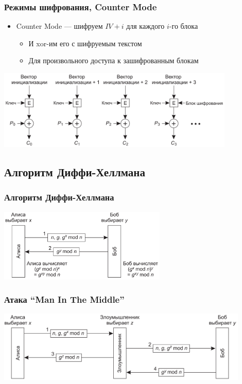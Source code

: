 \documentclass{../cscslides}
\begin{document}
    \begin{frame}
        \frametitle{Режимы шифрования, Counter Mode}
        \begin{itemize}
            \item Counter Mode --- шифруем $IV + i$ для каждого $i$-го блока
            \begin{itemize}
                \item И xor-им его с шифруемым текстом
                \item Для произвольного доступа к зашифрованным блокам
            \end{itemize}
        \end{itemize}
        \begin{center}
            \includegraphics[width=0.85\textwidth]{cm.png}
        \end{center}
    \end{frame}

    \subsection{Алгоритм Диффи-Хеллмана}

    \begin{frame}
        \frametitle{Алгоритм Диффи-Хеллмана}
        \begin{center}
            \includegraphics[width=0.6\textwidth]{diffieHellman.png}
        \end{center}
    \end{frame}

    \begin{frame}
        \frametitle{Атака ``Man In The Middle''}
        \begin{center}
            \includegraphics[width=0.9\textwidth]{diffieHellmanMitm.png}
        \end{center}
    \end{frame}
\end{document}

